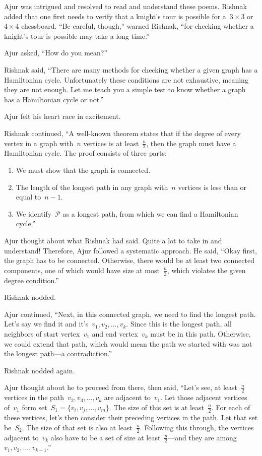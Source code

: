 Ajur was intrigued and resolved to read and understand these poems. Rishnak added that one first needs to verify that a knight's tour is possible for a~$3\times3$ or~$4\times4$ chessboard. ``Be careful, though,'' warned Rishnak, ``for checking whether a knight's tour is possible may take a long time.''

Ajur asked, ``How do you mean?''

Rishnak said, ``There are many methods for checking whether a given graph has a Hamiltonian cycle. Unfortunately these conditions are not exhaustive, meaning they are not enough. Let me teach you a simple test to know whether a graph has a Hamiltonian cycle or not.''

Ajur felt his heart race in excitement.

Rishnak continued, ``A well-known theorem states that if the degree of every vertex in a graph with~$n$ vertices is at least~$\frac{n}{2}$, then the graph must have a Hamiltonian cycle. The proof consists of three parts:
\begin{enumerate}
    \item We must show that the graph is connected.
    \item The length of the longest path in any graph with~$n$ vertices is less than or equal to~$n-1$.
    \item We identify~$\mathcal{P}$ as a longest path, from which we can find a Hamiltonian cycle.''
\end{enumerate}

Ajur thought about what Rishnak had said. Quite a lot to take in and understand! Therefore, Ajur followed a systematic approach. He said, ``Okay first, the graph has to be connected. Otherwise, there would be at least two connected components, one of which would have size at most~$\frac{n}{2}$, which violates the given degree condition.''

Rishnak nodded.

Ajur continued, ``Next, in this connected graph, we need to find the longest path. Let's say we find it and it's~$v_1,v_2,\ldots,v_k$. Since this is the longest path, all neighbors of start vertex~$v_1$ and end vertex~$v_k$ must be in this path. Otherwise, we could extend that path, which would mean the path we started with was not the longest path---a contradiction.''

Rishnak nodded again.

Ajur thought about he to proceed from there, then said, ``Let's see, at least~$\frac{n}{2}$ vertices in the path~$v_2,v_3,\ldots,v_k$ are adjacent to~$v_1$. Let those adjacent vertices of~$v_1$ form set~$S_1=\{v_i,v_j,\ldots,v_m\}$. The size of this set is at least~$\frac{n}{2}$. For each of these vertices, let's then consider their preceding vertices in the path. Let that set be~$S_2$. The size of that set is also at least~$\frac{n}{2}$. Following this through, the vertices adjacent to~$v_k$ also have to be a set of size at least~$\frac{n}{2}$---and they are among~$v_1,v_2,\ldots,v_{k-1}$.''

